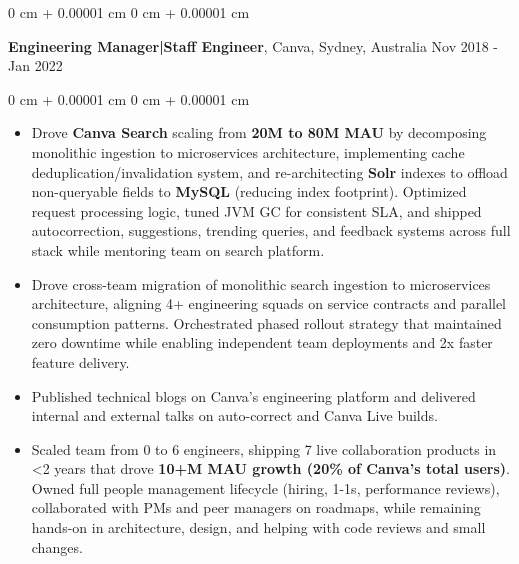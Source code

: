 \documentclass[10pt, letterpaper]{article}
\newenvironment{highlights}{
    \begin{itemize}[
        topsep=0.10 cm,
        parsep=0.10 cm,
        partopsep=0pt,
        itemsep=0pt,
        leftmargin=0 cm + 10pt
    ]
}{
    \end{itemize}
} %
\newenvironment{onecolentry}{
    \begin{adjustwidth}{
        0 cm + 0.00001 cm
    }{
        0 cm + 0.00001 cm
    }
}{
    \end{adjustwidth}
} %
\newenvironment{twocolentry}[2][]{
    \onecolentry
    \def\secondColumn{#2}
    \setcolumnwidth{\fill, 4.5 cm}
    \begin{paracol}{2}
}{
    \switchcolumn \raggedleft \secondColumn
    \end{paracol}
    \endonecolentry
} %
\begin{document}
        \vspace{0.15 cm}

        \begin{twocolentry}{
            Nov 2018 - Jan 2022
        }
            \textbf{Engineering Manager|Staff Engineer}, Canva, Sydney, Australia\end{twocolentry}

        \vspace{0.10 cm}
        \begin{onecolentry}
            \begin{highlights}
                \item Drove \textbf{Canva Search} scaling from \textbf{20M to 80M MAU} by decomposing monolithic ingestion to microservices architecture, implementing cache deduplication/invalidation system, and re-architecting \textbf{Solr} indexes to offload non-queryable fields to \textbf{MySQL} (reducing index footprint). Optimized request processing logic, tuned JVM GC for consistent SLA, and shipped autocorrection, suggestions, trending queries, and feedback systems across full stack while mentoring team on search platform.
                \item Drove cross-team migration of monolithic search ingestion to microservices architecture, aligning 4+ engineering squads on service contracts and parallel consumption patterns. Orchestrated phased rollout strategy that maintained zero downtime while enabling independent team deployments and 2x faster feature delivery.
                \item Published technical blogs on Canva's engineering platform and delivered internal and external talks on auto-correct and Canva Live builds.
                \item Scaled team from 0 to 6 engineers, shipping 7 live collaboration products in <2 years that drove \textbf{10+M MAU growth (20\% of Canva's total users)}. Owned full people management lifecycle (hiring, 1-1s, performance reviews), collaborated with PMs and peer managers on roadmaps, while remaining hands-on in architecture, design, and helping with code reviews and small changes.
            \end{highlights}
        \end{onecolentry}
\end{document}
